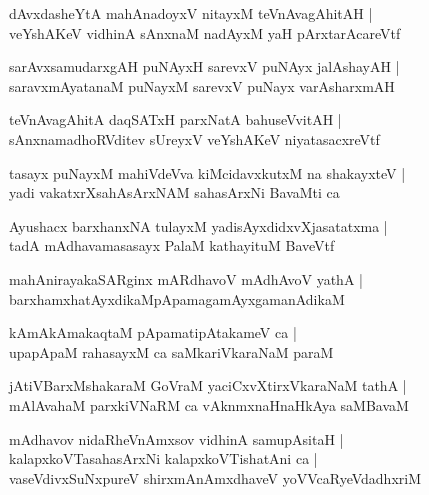 \documentclass[twoside,12pt,openright]{book}
\newcounter{shloka}[chapter]
\begin{document}
\begin{shloka}%
dAvxdasheYtA mahAnadoyxV nitayxM teVnAvagAhitAH |\\
veYshAKeV vidhinA sAnxnaM nadAyxM yaH pArxtarAcareVtf
\end{shloka}

\begin{shloka}%
sarAvxsamudarxgAH puNAyxH sarevxV puNAyx jalAshayAH |\\
saravxmAyatanaM puNayxM sarevxV puNayx varAsharxmAH
\end{shloka}

\begin{shloka}%
teVnAvagAhitA daqSATxH parxNatA bahuseVvitAH |\\
sAnxnamadhoRVditev sUreyxV veYshAKeV niyatasacxreVtf
\end{shloka}

\begin{shloka}%
tasayx puNayxM mahiVdeVva kiMcidavxkutxM na shakayxteV |\\
yadi vakatxrXsahAsArxNAM sahasArxNi BavaMti ca 
\end{shloka}

\begin{shloka}%
Ayushacx barxhanxNA tulayxM yadisAyxdidxvXjasatatxma |\\
tadA mAdhavamasasayx PalaM kathayituM BaveVtf 
\end{shloka}

\begin{shloka}%
mahAnirayakaSARginx mARdhavoV mAdhAvoV yathA |\\
barxhamxhatAyxdikaMpApamagamAyxgamanAdikaM 
\end{shloka}

\begin{shloka}%
kAmAkAmakaqtaM pApamatipAtakameV ca |\\
upapApaM rahasayxM ca saMkariVkaraNaM paraM 
\end{shloka}

\begin{shloka}%
jAtiVBarxMshakaraM GoVraM yaciCxvXtirxVkaraNaM tathA |\\
mAlAvahaM parxkiVNaRM ca vAknmxnaHnaHkAya saMBavaM  
\end{shloka}

\begin{shloka}%
mAdhavov nidaRheVnAmxsov vidhinA samupAsitaH |\\
kalapxkoVTasahasArxNi kalapxkoVTishatAni ca |\\
vaseVdivxSuNxpureV shirxmAnAmxdhaveV yoVVcaRyeVdadhxriM 
\end{shloka}
\end{document}
